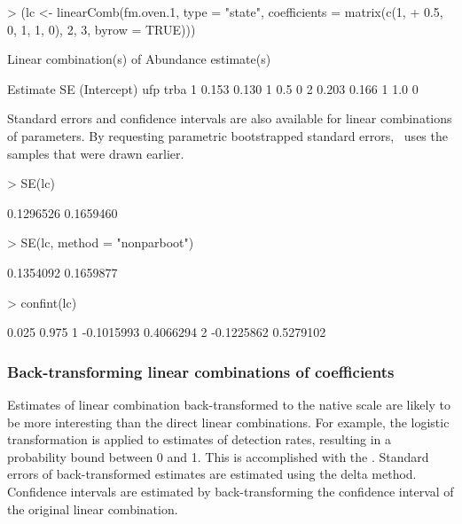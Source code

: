 \documentclass[article,shortnames]{jss}
\newcommand{\um}{\pkg{unmarked}}
\begin{document}
\begin{Schunk}
\begin{Sinput}
> (lc <- linearComb(fm.oven.1, type = "state", coefficients = matrix(c(1, 
+     0.5, 0, 1, 1, 0), 2, 3, byrow = TRUE)))
\end{Sinput}
\begin{Soutput}
Linear combination(s) of Abundance estimate(s)

  Estimate    SE (Intercept) ufp trba
1    0.153 0.130           1 0.5    0
2    0.203 0.166           1 1.0    0
\end{Soutput}
\end{Schunk}

Standard errors and confidence intervals are also available for linear
combinations of parameters.  By requesting parametric bootstrapped
standard errors, \um\ uses the samples that were drawn earlier.

\begin{Schunk}
\begin{Sinput}
> SE(lc)
\end{Sinput}
\begin{Soutput}
[1] 0.1296526 0.1659460
\end{Soutput}
\begin{Sinput}
> SE(lc, method = "nonparboot")
\end{Sinput}
\begin{Soutput}
[1] 0.1354092 0.1659877
\end{Soutput}
\begin{Sinput}
> confint(lc)
\end{Sinput}
\begin{Soutput}
       0.025     0.975
1 -0.1015993 0.4066294
2 -0.1225862 0.5279102
\end{Soutput}
\end{Schunk}

\subsubsection{Back-transforming linear combinations of coefficients}

Estimates of linear combination back-transformed to the native scale
are likely to be more interesting than the direct linear combinations.
For example, the logistic transformation is applied to estimates of
detection rates, resulting in a probability bound between 0 and
1. This is accomplished with the .  Standard
errors of back-transformed estimates are estimated using the delta
method.  Confidence intervals are estimated by back-transforming the
confidence interval of the original linear combination.
\end{document}
